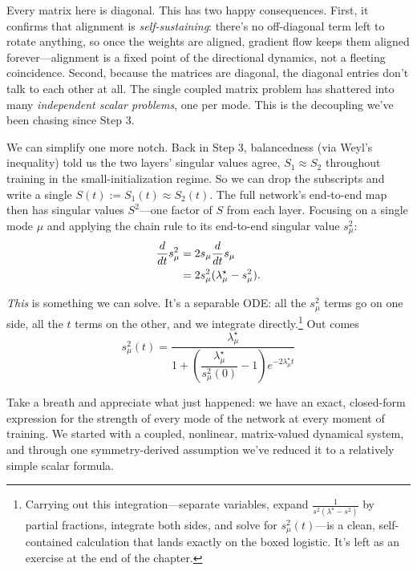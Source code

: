 Every matrix here is diagonal. This has two happy consequences. First, it
confirms that alignment is \emph{self-sustaining}: there's no off-diagonal term
left to rotate anything, so once the weights are aligned, gradient flow keeps them
aligned forever---alignment is a fixed point of the directional dynamics, not a
fleeting coincidence. Second, because the matrices are diagonal, the diagonal
entries don't talk to each other at all. The single coupled matrix problem has
shattered into many \emph{independent scalar problems}, one per mode. This is the
decoupling we've been chasing since Step 3.

We can simplify one more notch. Back in Step 3, balancedness (via Weyl's
inequality) told us the two layers' singular values agree, $S_1 \approx S_2$
throughout training in the small-initialization regime. So we can drop the
subscripts and write a single $S(t) := S_1(t) \approx S_2(t)$. The full network's
end-to-end map then has singular values $S^2$---one factor of $S$ from each layer.
Focusing on a single mode $\mu$ and applying the chain rule to its end-to-end
singular value $s_\mu^2$:
\begin{align*}
    \frac{d}{dt}s_\mu^2 &= 2 s_\mu \frac{d}{dt}s_\mu \notag \\
    &= 2 s_\mu^2 (\lambda^\star_\mu - s_\mu^2).
\end{align*}

\emph{This} is something we can solve. It's a
separable ODE: all the $s_\mu^2$ terms go on one side, all the $t$ terms on the
other, and we integrate directly.\footnote{Carrying out this integration---separate
variables, expand $\frac{1}{s^2(\lambda^\star - s^2)}$ by partial fractions,
integrate both sides, and solve for $s^2_\mu(t)$---is a clean, self-contained
calculation that lands exactly on the boxed logistic. It's left as an exercise at
the end of the chapter.} Out comes
\begin{equation}
    \boxed{s^2_\mu(t) = \frac{\lambda^\star_\mu}{1 + \left(\dfrac{\lambda^\star_\mu}{s^2_\mu(0)} - 1\right) e^{-2 \lambda^\star_\mu t}}}
    \label{eq:solution}
\end{equation}

Take a breath and appreciate what just happened: we have an exact, closed-form
expression for the strength of every mode of the network at every moment of
training. We started with a coupled, nonlinear, matrix-valued dynamical system,
and through one symmetry-derived assumption we've reduced it to a relatively simple scalar formula.


